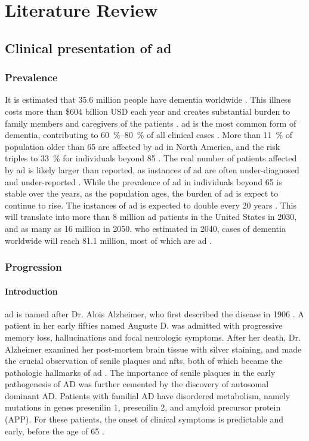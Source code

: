 \chapter{Literature Review}

\section{Clinical presentation of \gls{ad}}
\subsection{Prevalence}
It is estimated that 35.6 million people have dementia worldwide \citep{who13}. This illness costs more than \$604 billion USD each year and creates substantial burden to family members and caregivers of the patients \citep{who13}. \gls{ad} is the most common form of dementia, contributing to \SIrange{60}{80}{\percent}  of all clinical cases \citep{ad16}. More than \SI{11}{\percent} of population older than 65 are affected by \gls{ad} in North America, and the risk triples to \SI{33}{\percent} for individuals beyond 85 \citep{hebert13}. The real number of patients affected by \gls{ad} is likely larger than reported, as instances of \gls{ad} are often under-diagnosed and under-reported \citep{barrett06, zaleta12}. While the prevalence of \gls{ad} in individuals beyond 65 is stable over the years, as the population ages, the burden of \gls{ad} is expect to continue to rise. The instances of \gls{ad} is expected to double every 20 years \citep{who13, hebert13}. This will translate into more than 8 million \gls{ad} patients in the United States in 2030, and as many as 16 million in 2050. \Gls{who} estimated in 2040, cases of dementia worldwide will reach 81.1 million, most of which are \gls{ad} \citep{who13}. 

\subsection{Progression}
\subsubsection{Introduction}

\gls{ad} is named after Dr. Alois Alzheimer, who first described the disease in 1906 \citep{goedert06}. A patient in her early fifties named Auguste D. was admitted with progressive memory loss, hallucinations and focal neurologic symptoms. After her death, Dr. Alzheimer examined her post-mortem brain tissue with silver staining, and made the crucial observation of senile plaques and \glspl{nft}, both of which became the pathologic hallmarks of \gls{ad} \citep{goedert06, dubois16}. The importance of senile plaques in the early pathogenesis of AD was further cemented by the discovery of autosomal dominant AD. Patients with familial AD have disordered \abeta{} metabolism, namely mutations in genes presenilin 1, presenilin 2, and amyloid precursor protein (APP). For these patients, the onset of clinical symptoms is predictable and early, before the age of 65 \citep{goedert06, dubois16}.

